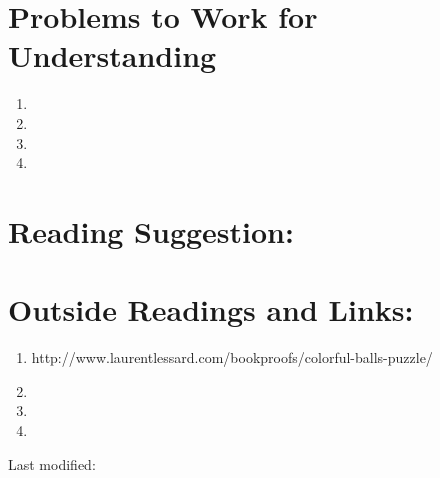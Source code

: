 \documentclass[12pt]{article}
\begin{document}
% 

\hr

\section*{Problems to Work for Understanding}
\begin{enumerate}
    \item
    \item
    \item
    \item
\end{enumerate}


\hr

\section*{Reading Suggestion:}




\hr

\section*{Outside Readings and Links:}
\begin{enumerate}
    \item
        http://www.laurentlessard.com/bookproofs/colorful-balls-puzzle/
    \item
    \item
    \item
\end{enumerate}

\hr

\mydisclaim \myfooter

Last modified:  \flastmod
\end{document}
